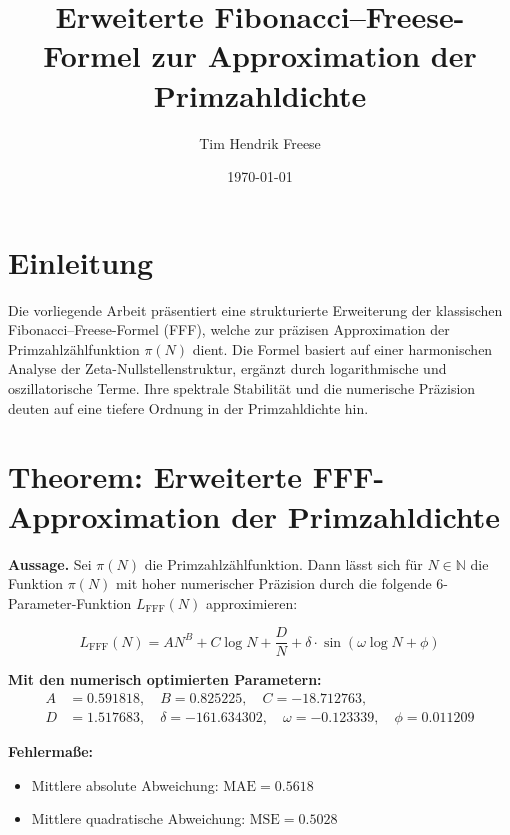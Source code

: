 \documentclass[12pt]{article}
\title{Erweiterte Fibonacci--Freese-Formel zur Approximation der Primzahldichte}
\author{Tim Hendrik Freese}
\date{\today}
\begin{document}
\maketitle

\section*{Einleitung}

Die vorliegende Arbeit präsentiert eine strukturierte Erweiterung der klassischen Fibonacci--Freese-Formel (FFF), welche zur präzisen Approximation der Primzahlzählfunktion $\pi(N)$ dient. Die Formel basiert auf einer harmonischen Analyse der Zeta-Nullstellenstruktur, ergänzt durch logarithmische und oszillatorische Terme. Ihre spektrale Stabilität und die numerische Präzision deuten auf eine tiefere Ordnung in der Primzahldichte hin.

\vspace{1em}

\section*{Theorem: Erweiterte FFF-Approximation der Primzahldichte}

\textbf{Aussage.}
Sei $\pi(N)$ die Primzahlzählfunktion. Dann lässt sich für $N \in \mathbb{N}$ die Funktion $\pi(N)$ mit hoher numerischer Präzision durch die folgende 6-Parameter-Funktion $L_{\text{FFF}}(N)$ approximieren:

\begin{equation}
L_{\text{FFF}}(N) = A N^{B} + C \log N + \frac{D}{N} + \delta \cdot \sin\left( \omega \log N + \phi \right)
\end{equation}

\textbf{Mit den numerisch optimierten Parametern:}
\begin{align*}
A &= 0.591818, \quad
B = 0.825225, \quad
C = -18.712763, \\
D &= 1.517683, \quad
\delta = -161.634302, \quad
\omega = -0.123339, \quad
\phi = 0.011209
\end{align*}

\textbf{Fehlermaße:}
\begin{itemize}
  \item Mittlere absolute Abweichung: $\text{MAE} = 0.5618$
  \item Mittlere quadratische Abweichung: $\text{MSE} = 0.5028$
\end{itemize}

\vspace{1em}
\end{document}
